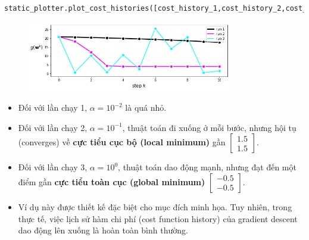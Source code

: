 \documentclass{book}
\begin{document}
\begin{lstlisting}[language=python]
    static_plotter.plot_cost_histories([cost_history_1,cost_history_2,cost_history_3],start = 0,points = True,labels = ['run 1','run 2', 'run 3'])
\end{lstlisting}
\begin{figure}[H]
    \centering
    \includegraphics[width=0.8\textwidth]{images/oscillation_in_cost_history_his.png}
\end{figure}

\begin{itemize}
    \item Đối với lần chạy 1, $\alpha=10^{-2}$ là quá nhỏ.
    \item Đối với lần chạy 2, $\alpha=10^{-1}$, thuật toán đi xuống ở mỗi bước, nhưng hội tụ (converges) về \textbf{cực tiểu cục bộ (local minimum)} gần $\begin{bmatrix} 1.5 \\ 1.5 \end{bmatrix}$.
    \item Đối với lần chạy 3, $\alpha=10^0$, thuật toán dao động mạnh, nhưng đạt đến một điểm gần \textbf{cực tiểu toàn cục (global minimum)} $\begin{bmatrix} -0.5 \\ -0.5 \end{bmatrix}$.
    \item Ví dụ này được thiết kế đặc biệt cho mục đích minh họa. Tuy nhiên, trong thực tế, việc lịch sử hàm chi phí (cost function history) của gradient descent dao động lên xuống là hoàn toàn bình thường.
\end{itemize}
\end{document}
